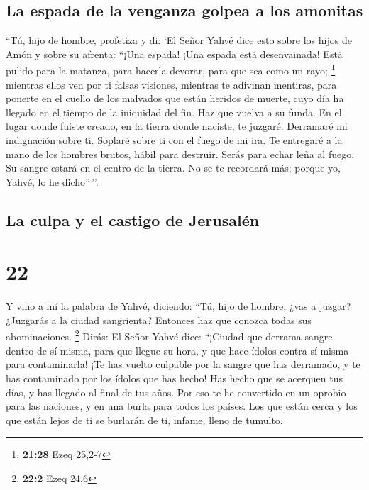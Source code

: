 \hypertarget{la-espada-de-la-venganza-golpea-a-los-amonitas}{%
\subsection{La espada de la venganza golpea a los
amonitas}\label{la-espada-de-la-venganza-golpea-a-los-amonitas}}

 ``Tú, hijo de hombre, profetiza y di: `El Señor Yahvé
dice esto sobre los hijos de Amón y sobre su afrenta: ``¡Una espada!
¡Una espada está desenvainada! Está pulido para la matanza, para hacerla
devorar, para que sea como un rayo; \footnote{\textbf{21:28} Ezeq 25,2-7}
 mientras ellos ven por ti falsas visiones, mientras te
adivinan mentiras, para ponerte en el cuello de los malvados que están
heridos de muerte, cuyo día ha llegado en el tiempo de la iniquidad del
fin.  Haz que vuelva a su funda. En el lugar donde fuiste
creado, en la tierra donde naciste, te juzgaré. 
Derramaré mi indignación sobre ti. Soplaré sobre ti con el fuego de mi
ira. Te entregaré a la mano de los hombres brutos, hábil para destruir.
 Serás para echar leña al fuego. Su sangre estará en el
centro de la tierra. No se te recordará más; porque yo, Yahvé, lo he
dicho''\,''.

\hypertarget{la-culpa-y-el-castigo-de-jerusaluxe9n}{%
\subsection{La culpa y el castigo de
Jerusalén}\label{la-culpa-y-el-castigo-de-jerusaluxe9n}}

\hypertarget{section-21}{%
\section{22}\label{section-21}}

 Y vino a mí la palabra de Yahvé, diciendo: 
``Tú, hijo de hombre, ¿vas a juzgar? ¿Juzgarás a la ciudad sangrienta?
Entonces haz que conozca todas sus abominaciones. \footnote{\textbf{22:2}
  Ezeq 24,6}  Dirás: El Señor Yahvé dice: ``¡Ciudad que
derrama sangre dentro de sí misma, para que llegue su hora, y que hace
ídolos contra sí misma para contaminarla!  ¡Te has vuelto
culpable por la sangre que has derramado, y te has contaminado por los
ídolos que has hecho! Has hecho que se acerquen tus días, y has llegado
al final de tus años. Por eso te he convertido en un oprobio para las
naciones, y en una burla para todos los países.  Los que
están cerca y los que están lejos de ti se burlarán de ti, infame, lleno
de tumulto.

